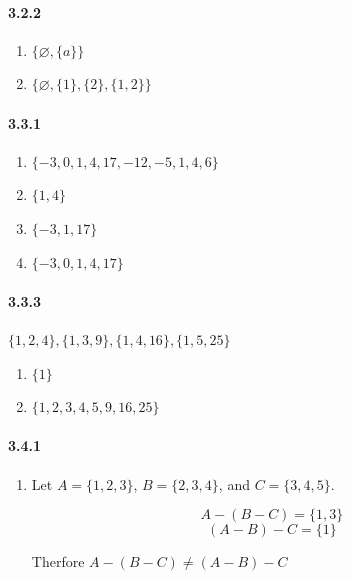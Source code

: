 \documentclass[11pt, letterpaper, twocolumn, fleqn]{article}
\let\emptyset\varnothing
\begin{document}
    \paragraph{3.2.2}
    \renewcommand{\labelenumi}{\alph{enumi}.}
    \begin{enumerate}
        \item $\{\emptyset, \{a\}\}$
        \item $\{\emptyset, \{1\},\{2\},\{1,2\}\}$
    \end{enumerate}
    
    \paragraph{3.3.1}
    \renewcommand{\labelenumi}{\alph{enumi}.}
    \begin{enumerate}
        \item $\{-3, 0, 1, 4, 17, -12, -5, 1, 4, 6\}$
        \item $\{1,4\}$
        \addtocounter{enumi}{3}
        \item $\{-3,1,17\}$
        \addtocounter{enumi}{1}
        \item $\{-3,0,1,4,17\}$
    \end{enumerate}
    
    \paragraph{3.3.3}
    $\{1,2,4\},\{1,3,9\},\{1,4,16\},\{1,5,25\}$
    
    \renewcommand{\labelenumi}{\alph{enumi}.}
    \begin{enumerate}
        \item $\{1\}$
        \item $\{1, 2, 3, 4, 5, 9, 16, 25\}$
    \end{enumerate}
    
    \paragraph{3.4.1}
    \renewcommand{\labelenumi}{\alph{enumi}.}
    \begin{enumerate}
        \item Let $A = \{1,2,3\}$, $B = \{2,3,4\}$, and $C = \{3,4,5\}$. 
        
        $$
            A-(B-C) = \{1,3\}
        $$
        $$
            (A-B)-C = \{1\}
        $$
        
        Therfore $A-(B-C) \neq (A-B)-C$
    \end{enumerate}
    
\end{document}
